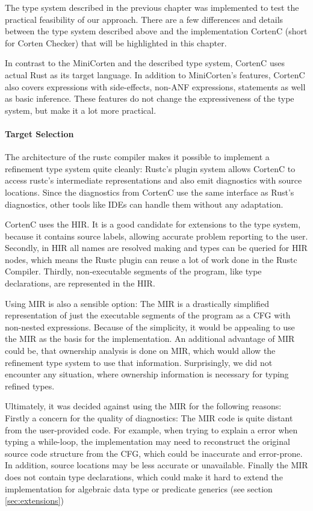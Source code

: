 \documentclass{book}
\theoremstyle{definition}
\begin{document}
The type system described in the previous chapter was implemented to test the practical feasibility of our approach.
There are a few differences and details between the type system described above and the implementation CortenC (short for Corten Checker) that will be highlighted in this chapter.

In contrast to the MiniCorten and the described type system, CortenC uses actual Rust as its target language. In addition to MiniCorten's features, CortenC also covers expressions with side-effects, non-ANF expressions, statements as well as basic inference.
These features do not change the expressiveness of the type system, but make it a lot more practical.

\paragraph{Target Selection}
The architecture of the rustc compiler makes it possible to implement a refinement type system quite cleanly: Rustc's plugin system allows CortenC to access rustc's intermediate representations and also emit diagnostics with source locations. Since the diagnostics from CortenC use the same interface as Rust's diagnostics, other tools like IDEs can handle them without any adaptation.

CortenC uses the HIR. It is a good candidate for extensions to the type system, because it contains source labels, allowing accurate problem reporting to the user. Secondly, in HIR all names are resolved making and types can be queried for HIR nodes, which means the Rustc plugin can reuse a lot of work done in the Rustc Compiler. Thirdly, non-executable segments of the program, like type declarations, are represented in the HIR.

Using MIR is also a sensible option: The MIR is a drastically simplified representation of just the executable segments of the program as a CFG with non-nested expressions. Because of the simplicity, it would be appealing to use the MIR as the basis for the implementation. 
An additional advantage of MIR could be, that ownership analysis is done on MIR, which would allow the refinement type system to use that information. Surprisingly, we did not encounter any situation, where ownership information is necessary for typing refined types.

Ultimately, it was decided against using the MIR for the following reasons:
Firstly a concern for the quality of diagnostics: The MIR code is quite distant from the user-provided code. For example, when trying to explain a error when typing a while-loop, the implementation may need to reconstruct the original source code structure from the CFG, which could be inaccurate and error-prone. 
In addition, source locations may be less accurate or unavailable. 
Finally the MIR does not contain type declarations, which could make it hard to extend the implementation for algebraic data type or predicate generics (see section \ref{sec:extensions})
\end{document}
